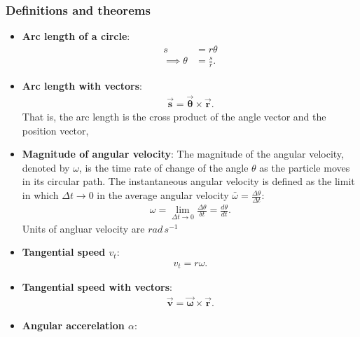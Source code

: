 \documentclass{report}
\begin{document}
    \subsubsection{Definitions and theorems}
    \begin{itemize}
        \item \textbf{Arc length of a circle}:
            \begin{align*}
                s &= r\theta  \\
                \implies \theta  &= \frac{s}{r}
            .\end{align*}
            \bigbreak \noindent 
        \item \textbf{Arc length with vectors}:
            \begin{align*}
                \vec{\mathbf{s}} = \vec{\mathbf{\theta }} \times \vec{\mathbf{r}}
            .\end{align*}
            That is, the arc length is the cross product of the angle vector and the position vector,
            \bigbreak \noindent 
        \item \textbf{Magnitude of angular velocity}:
            The magnitude of the angular velocity, denoted by \(\omega\), is the time rate of change of the angle \(\theta\) as the particle moves in its circular path. The instantaneous angular velocity is defined as the limit in which \(\Delta t \rightarrow 0\) in the average angular velocity \(\bar{\omega} = \frac{\Delta \theta}{\Delta t}\):
            \begin{align*}
                \omega = \lim\limits_{\Delta t \to 0}{\frac{\Delta \theta }{\delta t}} = \frac{d\theta }{dt}
            .\end{align*}
            \bigbreak \noindent 
            Units of angluar velocity are $rad\,s^{-1} $
        \item \textbf{Tangential speed $v_{t} $}:
            \begin{align*}
                v_{t} = r\omega
            .\end{align*}
        \item \textbf{Tangential speed with vectors}:
            \begin{align*}
                \vec{\mathbf{v}} = \vec{\mathbf{\omega}} \times \vec{\mathbf{r}}
            .\end{align*}
        \item \textbf{Angular accerelation $\alpha$}:
            \[
\]
\end{itemize}
\end{document}
